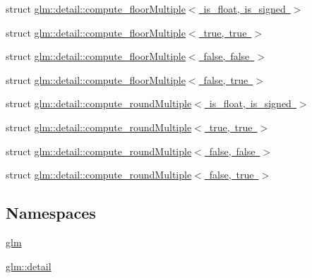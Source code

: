 \begin{DoxyCompactItemize}
struct \mbox{\hyperlink{structglm_1_1detail_1_1compute__floor_multiple}{glm\+::detail\+::compute\+\_\+floor\+Multiple$<$ is\+\_\+float, is\+\_\+signed $>$}}
\item 
struct \mbox{\hyperlink{structglm_1_1detail_1_1compute__floor_multiple_3_01true_00_01true_01_4}{glm\+::detail\+::compute\+\_\+floor\+Multiple$<$ true, true $>$}}
\item 
struct \mbox{\hyperlink{structglm_1_1detail_1_1compute__floor_multiple_3_01false_00_01false_01_4}{glm\+::detail\+::compute\+\_\+floor\+Multiple$<$ false, false $>$}}
\item 
struct \mbox{\hyperlink{structglm_1_1detail_1_1compute__floor_multiple_3_01false_00_01true_01_4}{glm\+::detail\+::compute\+\_\+floor\+Multiple$<$ false, true $>$}}
\item 
struct \mbox{\hyperlink{structglm_1_1detail_1_1compute__round_multiple}{glm\+::detail\+::compute\+\_\+round\+Multiple$<$ is\+\_\+float, is\+\_\+signed $>$}}
\item 
struct \mbox{\hyperlink{structglm_1_1detail_1_1compute__round_multiple_3_01true_00_01true_01_4}{glm\+::detail\+::compute\+\_\+round\+Multiple$<$ true, true $>$}}
\item 
struct \mbox{\hyperlink{structglm_1_1detail_1_1compute__round_multiple_3_01false_00_01false_01_4}{glm\+::detail\+::compute\+\_\+round\+Multiple$<$ false, false $>$}}
\item 
struct \mbox{\hyperlink{structglm_1_1detail_1_1compute__round_multiple_3_01false_00_01true_01_4}{glm\+::detail\+::compute\+\_\+round\+Multiple$<$ false, true $>$}}
\end{DoxyCompactItemize}
\subsection*{Namespaces}
\begin{DoxyCompactItemize}
\item 
 \mbox{\hyperlink{namespaceglm}{glm}}
\item 
 \mbox{\hyperlink{namespaceglm_1_1detail}{glm\+::detail}}
\end{DoxyCompactItemize}
